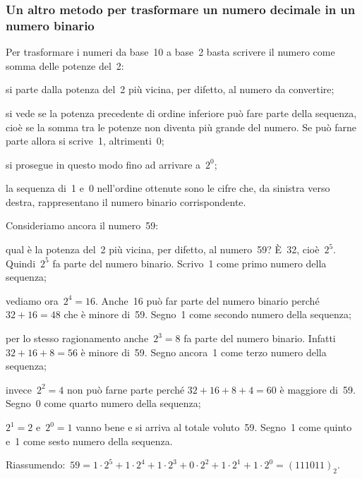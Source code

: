\subsubsection{Un altro metodo per trasformare un numero decimale in un numero binario}

Per trasformare i numeri da base~10 a base~2 basta scrivere il numero
come somma delle potenze del~2:
\begin{enumeratea}
\item si parte dalla potenza del~2 più vicina, per difetto, al numero da convertire;
\item si vede se la potenza precedente di ordine inferiore può fare parte della sequenza, cioè se la somma tra
le potenze non diventa più grande del numero. Se può farne parte allora si scrive~1, altrimenti~0;
\item si prosegue in questo modo fino ad arrivare a~$2^{0}$;
\item la sequenza di~1 e~0 nell'ordine ottenute sono le cifre che, da sinistra verso destra, rappresentano il numero binario corrispondente.
\end{enumeratea}

\begin{exrig}
\begin{esempio}
Consideriamo ancora il numero~59:
\begin{itemize*}
\item qual è la potenza del~2 più vicina, per difetto, al numero~59? \`E~32, cioè~$2^{5}$. Quindi~$2^{5}$
fa parte del numero binario. Scrivo~1 come primo numero della sequenza;
\item vediamo ora~$2^{4}=16$. Anche~16 può far parte del numero binario perché~$32 + 16 = 48$ che è minore di~59.
Segno~1 come secondo numero della sequenza;
\item per lo stesso ragionamento anche~$2^{3}=8$ fa parte del numero binario.
Infatti~$32 + 16 + 8 = 56$ è minore di~59. Segno ancora~1 come terzo numero della sequenza;
\item invece~$2^{2}=4$ non può farne parte perché $32 + 16 + 8 + 4 = 60$ è maggiore di~59. Segno~0 come quarto numero
della sequenza;
\item $2^{1}=2$ e~$2^{0}=1$ vanno bene e si arriva al totale voluto~59. Segno~1 come quinto e~1 come sesto numero
della sequenza.
\end{itemize*}
Riassumendo:~$59=1\cdot 2^{5}+1\cdot 2^{4}+1\cdot2^{3}+0\cdot 2^{2}+1\cdot 2^{1}+1\cdot2^{0}=(111011)_{2}$.
\end{esempio}
\end{exrig}

